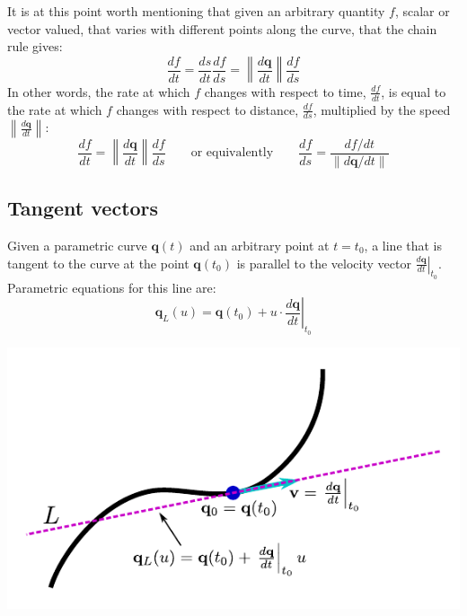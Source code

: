 \documentclass{article}
\begin{document}
\vspace{5mm}

It is at this point worth mentioning that given an arbitrary quantity \(f\), scalar or vector valued, that varies with different points along the curve, that the chain rule gives: 
\[\frac{df}{dt} = \frac{ds}{dt}\frac{df}{ds} = \left\|\frac{d\mathbf{q}}{dt}\right\|\frac{df}{ds}\]
In other words, the rate at which \(f\) changes with respect to time, \(\frac{df}{dt}\), is equal to the rate at which \(f\) changes with respect to distance, \(\frac{df}{ds}\), multiplied by the speed \(\left\|\frac{d\mathbf{q}}{dt}\right\|\): 
\[\frac{df}{dt} = \left\|\frac{d\mathbf{q}}{dt}\right\|\frac{df}{ds} \quad\quad\text{or equivalently}\quad\quad \frac{df}{ds} = \frac{df/dt}{\|d\mathbf{q}/dt\|}\]




\subsection*{Tangent vectors}

Given a parametric curve \(\mathbf{q}(t)\) and an arbitrary point at \(t = t_0\), a line that is tangent to the curve at the point \(\mathbf{q}(t_0)\) is parallel to the velocity vector \(\left.\frac{d\mathbf{q}}{dt}\right|_{t_0}\). Parametric equations for this line are:
\[\mathbf{q}_L(u) = \mathbf{q}(t_0) + u \cdot \left.\frac{d\mathbf{q}}{dt}\right|_{t_0}\]

\begin{center}
\includegraphics[width = \textwidth]{parametric_curve_tangents}
\end{center}
\end{document}

